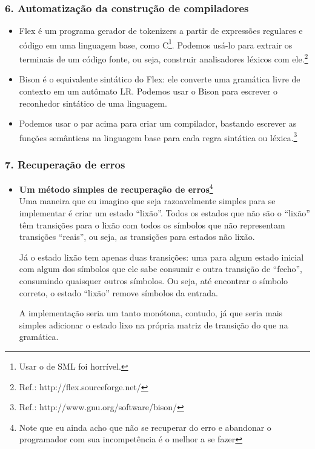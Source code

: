 \documentclass{beamer}
\begin{document}
\begin{frame}
  \frametitle{6. Automatiza\c c\~ao da constru\c c\~ao de compiladores}
  \begin{itemize}
  \item Flex \'e um programa gerador de tokenizers a partir de
    express\~oes regulares e c\'odigo em uma linguagem base, como
    C\footnote{Usar o de SML foi horr\'ivel.}. Podemos us\'a-lo para
    extrair os terminais de um c\'odigo fonte, ou seja, construir
    analisadores l\'exicos com ele.\footnote{Ref.: http://flex.sourceforge.net/}
  \item Bison \'e o equivalente sint\'atico do Flex: ele converte uma
    gram\'atica livre de contexto em um aut\^omato LR. Podemos usar o
    Bison para escrever o reconhedor sint\'atico de uma linguagem.
  \item Podemos usar o par acima para criar um compilador, bastando
    escrever as fun\c c\~oes sem\^anticas na linguagem base para cada
    regra sint\'atica ou
    l\'exica.\footnote{Ref.: http://www.gnu.org/software/bison/}
  \end{itemize}
\end{frame}

\begin{frame}
  \frametitle{7. Recupera\c c\~ao de erros}
  \begin{itemize}
  \item \textbf{Um m\'etodo simples de recupera\c c\~ao de
      erros}\footnote{Note que eu ainda acho que n\~ao se recuperar do
    erro e abandonar o programador com sua incompet\^encia \'e o
    melhor a se fazer}\\
  Uma maneira que eu imagino que seja razoavelmente simples para se
  implementar \'e criar um estado ``lix\~ao''. Todos os estados que
  n\~ao s\~ao o ``lix\~ao'' t\^em transi\c c\~oes para o lix\~ao com
  todos os s\'imbolos que n\~ao representam transi\c c\~oes ``reais'',
  ou seja, as transi\c c\~oes para estados n\~ao lix\~ao.

  J\'a o estado lix\~ao tem apenas duas transi\c c\~oes: uma para
  algum estado inicial com algum dos s\'imbolos que ele sabe consumir
  e outra transi\c c\~ao de ``fecho'', consumindo quaisquer outros
  s\'imbolos. Ou seja, at\'e encontrar o s\'imbolo correto, o estado
  ``lix\~ao'' remove s\'imbolos da entrada.

  A implementa\c c\~ao seria um tanto mon\'otona, contudo, j\'a que
  seria mais simples adicionar o estado lixo na pr\'opria matriz de
  transi\c c\~ao do que na gram\'atica.
  \end{itemize}
\end{frame}
\end{document}
